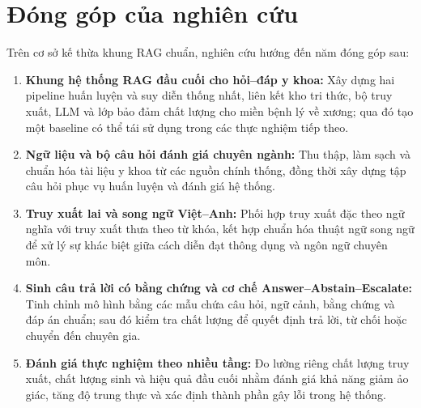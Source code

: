 \section{Đóng góp của nghiên cứu}

Trên cơ sở kế thừa khung RAG chuẩn, nghiên cứu hướng đến năm đóng góp sau:

\begin{enumerate}[label=(\arabic*)]
    \item \textbf{Khung hệ thống RAG đầu cuối cho hỏi--đáp y khoa:} Xây dựng hai pipeline huấn luyện và suy diễn thống nhất, liên kết kho tri thức, bộ truy xuất, LLM và lớp bảo đảm chất lượng cho miền bệnh lý về xương; qua đó tạo một baseline có thể tái sử dụng trong các thực nghiệm tiếp theo.

    \item \textbf{Ngữ liệu và bộ câu hỏi đánh giá chuyên ngành:} Thu thập, làm sạch và chuẩn hóa tài liệu y khoa từ các nguồn chính thống, đồng thời xây dựng tập câu hỏi phục vụ huấn luyện và đánh giá hệ thống.

    \item \textbf{Truy xuất lai và song ngữ Việt--Anh:} Phối hợp truy xuất đặc theo ngữ nghĩa với truy xuất thưa theo từ khóa, kết hợp chuẩn hóa thuật ngữ song ngữ để xử lý sự khác biệt giữa cách diễn đạt thông dụng và ngôn ngữ chuyên môn.

    \item \textbf{Sinh câu trả lời có bằng chứng và cơ chế Answer--Abstain--Escalate:} Tinh chỉnh mô hình bằng các mẫu chứa câu hỏi, ngữ cảnh, bằng chứng và đáp án chuẩn; sau đó kiểm tra chất lượng để quyết định trả lời, từ chối hoặc chuyển đến chuyên gia.

    \item \textbf{Đánh giá thực nghiệm theo nhiều tầng:} Đo lường riêng chất lượng truy xuất, chất lượng sinh và hiệu quả đầu cuối nhằm đánh giá khả năng giảm ảo giác, tăng độ trung thực và xác định thành phần gây lỗi trong hệ thống.
\end{enumerate}
